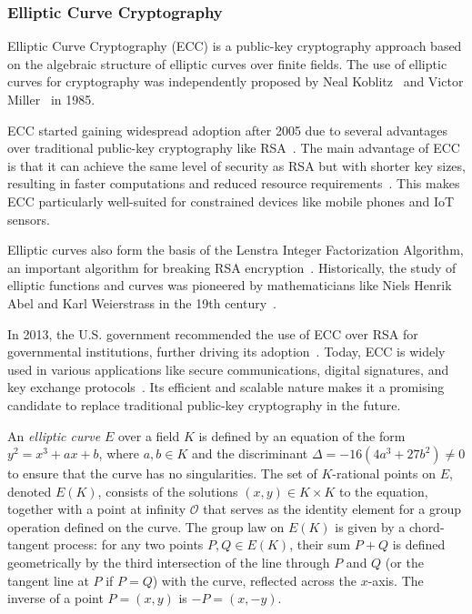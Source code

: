 \documentclass{iacrtrans}
\begin{document}
\subsubsection{Elliptic Curve Cryptography}

Elliptic Curve Cryptography (ECC) is a public-key cryptography approach based on the algebraic structure of elliptic curves over finite fields. The use of elliptic curves for cryptography was independently proposed by Neal Koblitz~\cite{Koblitz1987} and Victor Miller~\cite{C:Miller85} in 1985.

ECC started gaining widespread adoption after 2005 due to several advantages over traditional public-key cryptography like RSA~\cite{RivShaAdl78}. The main advantage of ECC is that it can achieve the same level of security as RSA but with shorter key sizes, resulting in faster computations and reduced resource requirements~\cite{AC:Kaliski98}. This makes ECC particularly well-suited for constrained devices like mobile phones and IoT sensors.

Elliptic curves also form the basis of the Lenstra Integer Factorization Algorithm, an important algorithm for breaking RSA encryption~\cite{}. Historically, the study of elliptic functions and curves was pioneered by mathematicians like Niels Henrik Abel and Karl Weierstrass in the 19th century~\cite{}.

In 2013, the U.S. government recommended the use of ECC over RSA for governmental institutions, further driving its adoption~\cite{}. Today, ECC is widely used in various applications like secure communications, digital signatures, and key exchange protocols~\cite{}. Its efficient and scalable nature makes it a promising candidate to replace traditional public-key cryptography in the future.

\begin{definition}
	An \textit{elliptic curve} $E$ over a field $K$ is defined by an equation of the form $y^2 = x^3 + ax + b$, where $a, b \in K$ and the discriminant $\Delta = -16(4a^3 + 27b^2) \neq 0$ to ensure that the curve has no singularities. The set of $K$-rational points on $E$, denoted $E(K)$, consists of the solutions $(x, y) \in K \times K$ to the equation, together with a point at infinity $\mathcal{O}$ that serves as the identity element for a group operation defined on the curve. The group law on $E(K)$ is given by a chord-tangent process: for any two points $P, Q \in E(K)$, their sum $P + Q$ is defined geometrically by the third intersection of the line through $P$ and $Q$ (or the tangent line at $P$ if $P = Q$) with the curve, reflected across the $x$-axis. The inverse of a point $P = (x, y)$ is $-P = (x, -y)$.
\end{definition}
\end{document}
